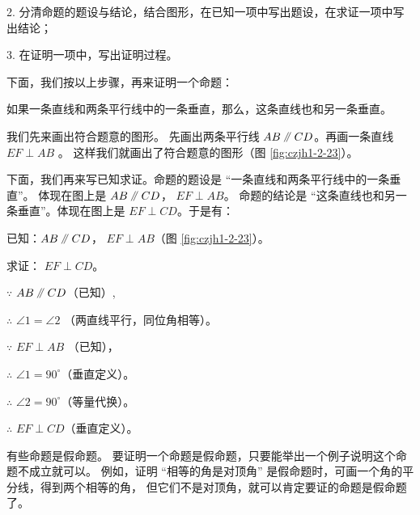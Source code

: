 2. 分清命题的题设与结论，结合图形，在已知一项中写出题设，在求证一项中写出结论；

3. 在证明一项中，写出证明过程。

下面，我们按以上步骤，再来证明一个命题：

\begin{dingli}[定理]
    如果一条直线和两条平行线中的一条垂直，那么，这条直线也和另一条垂直。
\end{dingli}

我们先来画出符合题意的图形。
先画出两条平行线 $AB \pingxing CD$。再画一条直线 $EF \perp AB$ 。
这样我们就画出了符合题意的图形（图 \ref{fig:czjh1-2-23}）。

下面，我们再来写已知求证。命题的题设是 “一条直线和两条平行线中的一条垂直”。
体现在图上是 $AB \pingxing CD$， $EF \perp AB$。
命题的结论是 “这条直线也和另一条垂直”。体现在图上是 $EF \perp CD$。于是有：

已知：$AB \pingxing CD$， $EF \perp AB$（图 \ref{fig:czjh1-2-23}）。

求证： $EF \perp CD$。

\zhengming $\because$ \quad $AB \pingxing CD$（已知）,

$\therefore$ \quad $\angle 1 = \angle 2$ （两直线平行，同位角相等）。

$\because$ \quad $EF \perp AB$ （已知），

$\therefore$ \quad $\angle 1 = 90^\circ$（垂直定义）。

$\therefore$ \quad $\angle 2 = 90^\circ$（等量代换）。

$\therefore$ \quad $EF \perp CD$（垂直定义）。

有些命题是假命题。 要证明一个命题是假命题，只要能举出一个例子说明这个命题不成立就可以。
例如，证明 “相等的角是对顶角” 是假命题时，可画一个角的平分线，得到两个相等的角，
但它们不是对顶角，就可以肯定要证的命题是假命题了。


